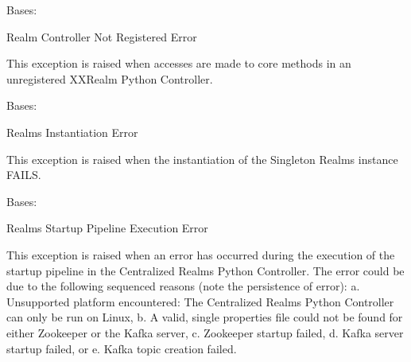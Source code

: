 \documentclass[letterpaper,10pt,english]{sphinxmanual}
\begin{document}

\begin{fulllineitems}
\label{\detokenize{Forge:Forge.RealmControllerNotRegisteredError}}
\sphinxAtStartPar
Bases: 

\sphinxAtStartPar
Realm Controller Not Registered Error

\sphinxAtStartPar
This exception is raised when accesses are made to core methods in an unregistered XXRealm Python Controller.

\end{fulllineitems}


\begin{fulllineitems}
\label{\detokenize{Forge:Forge.RealmsInstantiationError}}
\sphinxAtStartPar
Bases: 

\sphinxAtStartPar
Realms Instantiation Error

\sphinxAtStartPar
This exception is raised when the instantiation of the Singleton Realms instance FAILS.

\end{fulllineitems}


\begin{fulllineitems}
\label{\detokenize{Forge:Forge.RealmsStartupPipelineExecutionError}}
\sphinxAtStartPar
Bases: 

\sphinxAtStartPar
Realms Startup Pipeline Execution Error

\sphinxAtStartPar
This exception is raised when an error has occurred during the execution of the startup pipeline in the Centralized
Realms Python Controller. The error could be due to the following sequenced reasons (note the persistence of error):
a. Unsupported platform encountered: The Centralized Realms Python Controller can only be run on Linux,
b. A valid, single properties file could not be found for either Zookeeper or the Kafka server,
c. Zookeeper startup failed,
d. Kafka server startup failed, or
e. Kafka topic creation failed.

\end{fulllineitems}
\end{document}
